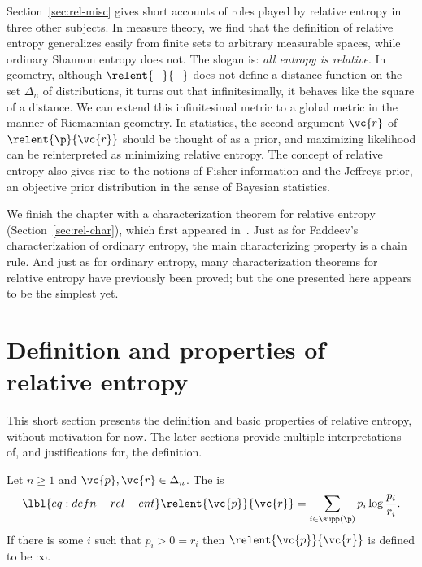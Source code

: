 Section~\ref{sec:rel-misc} gives short accounts of roles played by relative
entropy in three other subjects.  In measure theory, we find that the
definition of relative entropy generalizes easily from finite sets to
arbitrary measurable spaces, while ordinary Shannon entropy does not.  The
slogan is: \emph{all%
%
% 
entropy is relative}.  In geometry, although $\relent{-}{-}$ does not
define a distance function on the set $\Delta_n$ of distributions, it turns
out that infinitesimally, it behaves like the square of a distance.  We can
extend this infinitesimal metric to a global metric in the manner of
Riemannian geometry.  In statistics, the second argument $\vc{r}$ of
$\relent{\p}{\vc{r}}$ should be thought of as a prior, and
maximizing likelihood can be reinterpreted as minimizing relative entropy.
The concept of relative entropy also gives rise to the notions of Fisher
information and the Jeffreys prior, an objective prior distribution in the
sense of Bayesian statistics.

We finish the chapter with a characterization theorem for relative entropy
(Section~\ref{sec:rel-char}), which first appeared in~\cite{SCRE}.  Just as
for Faddeev's characterization of ordinary entropy, the main characterizing
property is a chain rule.  And just as for ordinary entropy, many
characterization theorems for relative entropy have previously been proved;
but the one presented here appears to be the simplest yet.



\section{Definition and properties of relative entropy}


This short section presents the definition and basic properties of
relative entropy, without motivation for now.  The later sections provide
multiple interpretations of, and justifications for, the definition.

\begin{defn}
Let $n \geq 1$ and $\vc{p}, \vc{r} \in \Delta_n$.  The
 is
% 
\begin{equation}
\lbl{eq:defn-rel-ent}
\relent{\vc{p}}{\vc{r}}
=
\sum_{i \in \supp(\p)} p_i \log \frac{p_i}{r_i}.
\end{equation}
% 
If there is some $i$ such that $p_i > 0 = r_i$ then
$\relent{\vc{p}}{\vc{r}}$ is defined to be $\infty$.
\end{defn}

